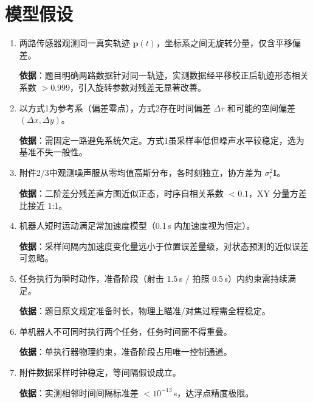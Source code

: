 \section{模型假设}

\begin{enumerate}
    \item 两路传感器观测同一真实轨迹 $\boldsymbol{p}(t)$，坐标系之间无旋转分量，仅含平移偏差。

    \textbf{依据}：题目明确两路数据针对同一轨迹，实测数据经平移校正后轨迹形态相关系数 $> 0.999$，引入旋转参数对残差无显著改善。

    \item 以方式1为参考系（偏差零点），方式2存在时间偏差 $\Delta\tau$ 和可能的空间偏差 $(\Delta x, \Delta y)$。

    \textbf{依据}：需固定一路避免系统欠定。方式1虽采样率低但噪声水平较稳定，选为基准不失一般性。

    \item 附件2/3中观测噪声服从零均值高斯分布，各时刻独立，协方差为 $\sigma_i^2 \boldsymbol{I}$。

    \textbf{依据}：二阶差分残差直方图近似正态，时序自相关系数 $< 0.1$，XY 分量方差比接近 1:1。

    \item 机器人短时运动满足常加速度模型（0.1\,s 内加速度视为恒定）。

    \textbf{依据}：采样间隔内加速度变化量远小于位置误差量级，对状态预测的近似误差可忽略。

    \item 任务执行为瞬时动作，准备阶段（射击 1.5\,s / 拍照 0.5\,s）内约束需持续满足。

    \textbf{依据}：题目原文规定准备时长，物理上瞄准/对焦过程需全程稳定。

    \item 单机器人不可同时执行两个任务，任务时间窗不得重叠。

    \textbf{依据}：单执行器物理约束，准备阶段占用唯一控制通道。

    \item 附件数据采样时钟稳定，等间隔假设成立。

    \textbf{依据}：实测相邻时间间隔标准差 $< 10^{-13}$\,s，达浮点精度极限。
\end{enumerate}
